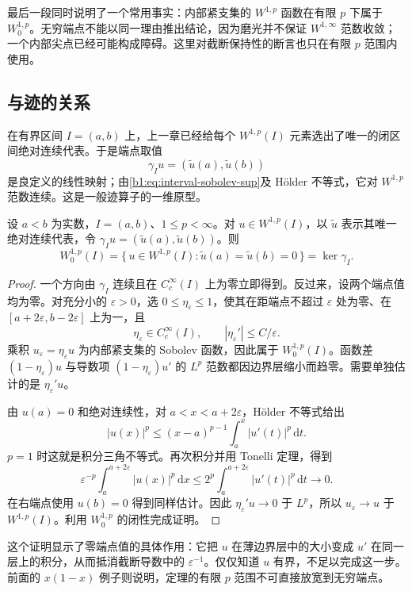 最后一段同时说明了一个常用事实：内部紧支集的 \(W^{1,p}\) 函数在有限 \(p\) 下属于 \(W_0^{1,p}\)。无穷端点不能以同一理由推出结论，因为磨光并不保证 \(W^{1,\infty}\) 范数收敛；一个内部尖点已经可能构成障碍。这里对截断保持性的断言也只在有限 \(p\) 范围内使用。

\subsection{与迹的关系}
\label{b1:subsec:220204}

在有界区间 \(I=(a,b)\) 上，上一章已经给每个 \(W^{1,p}(I)\) 元素选出了唯一的闭区间绝对连续代表。于是端点取值
\[
 \gamma_Iu=(\widetilde u(a),\widetilde u(b))
\]
是良定义的线性映射；由\eqref{b1:eq:interval-sobolev-sup}及 Hölder 不等式，它对 \(W^{1,p}\) 范数连续。这是一般迹算子的一维原型。

\begin{theorem}\label{b1:thm:interval-zero-boundary}
设 \(a<b\) 为实数，\(I=(a,b)\)、\(1\leq p<\infty\)。对 \(u\in W^{1,p}(I)\)，以 \(\widetilde u\) 表示其唯一绝对连续代表，令 \(\gamma_Iu=(\widetilde u(a),\widetilde u(b))\)。则
\[
 W_0^{1,p}(I)
 =\{\,u\in W^{1,p}(I):\widetilde u(a)=\widetilde u(b)=0\,\}
 =\ker\gamma_I.
\]
\end{theorem}
\begin{proof}
一个方向由 \(\gamma_I\) 连续且在 \(C_c^\infty(I)\) 上为零立即得到。反过来，设两个端点值均为零。对充分小的 \(\varepsilon>0\)，选 \(0\le\eta_\varepsilon\le1\)，使其在距端点不超过 \(\varepsilon\) 处为零、在 \([a+2\varepsilon,b-2\varepsilon]\) 上为一，且
\[
 \eta_\varepsilon\in C_c^\infty(I),\qquad
 |\eta_\varepsilon'|\le C/\varepsilon.
\]
乘积 \(u_\varepsilon=\eta_\varepsilon u\) 为内部紧支集的 Sobolev 函数，因此属于 \(W_0^{1,p}(I)\)。函数差 \((1-\eta_\varepsilon)u\) 与导数项 \((1-\eta_\varepsilon)u'\) 的 \(L^p\) 范数都因边界层缩小而趋零。需要单独估计的是 \(\eta_\varepsilon'u\)。

由 \(u(a)=0\) 和绝对连续性，对 \(a<x<a+2\varepsilon\)，Hölder 不等式给出
\[
 |u(x)|^p
 \le (x-a)^{p-1}\int_a^x|u'(t)|^p\,\mathrm dt.
\]
\(p=1\) 时这就是积分三角不等式。再次积分并用 Tonelli 定理，得到
\[
 \varepsilon^{-p}\int_a^{a+2\varepsilon}|u(x)|^p\,\mathrm dx
 \le 2^p\int_a^{a+2\varepsilon}|u'(t)|^p\,\mathrm dt
 \longrightarrow0.
\]
在右端点使用 \(u(b)=0\) 得到同样估计。因此 \(\eta_\varepsilon'u\to0\) 于 \(L^p\)，所以 \(u_\varepsilon\to u\) 于 \(W^{1,p}(I)\)。利用 \(W_0^{1,p}\) 的闭性完成证明。
\end{proof}

这个证明显示了零端点值的具体作用：它把 \(u\) 在薄边界层中的大小变成 \(u'\) 在同一层上的积分，从而抵消截断导数中的 \(\varepsilon^{-1}\)。仅仅知道 \(u\) 有界，不足以完成这一步。前面的 \(x(1-x)\) 例子则说明，定理的有限 \(p\) 范围不可直接放宽到无穷端点。

